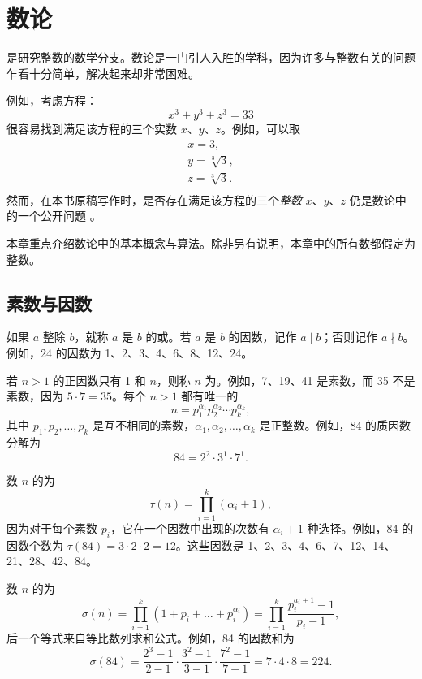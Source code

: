 \chapter{数论}


是研究整数的数学分支。数论是一门引人入胜的学科，因为许多与整数有关的问题乍看十分简单，解决起来却非常困难。

例如，考虑方程：
\[x^3 + y^3 + z^3 = 33\]
很容易找到满足该方程的三个实数 $x$、$y$、$z$。例如，可以取
\[
\begin{array}{lcl}
x = 3, \\
y = \sqrt[3]{3}, \\
z = \sqrt[3]{3}.\\
\end{array}
\]
然而，在本书原稿写作时，是否存在满足该方程的三个\emph{整数} $x$、$y$、$z$ 仍是数论中的一个公开问题 \cite{bec07}。

本章重点介绍数论中的基本概念与算法。除非另有说明，本章中的所有数都假定为整数。

\section{素数与因数}


如果 $a$ 整除 $b$，就称 $a$ 是 $b$ 的或。若 $a$ 是 $b$ 的因数，记作 $a \mid b$；否则记作 $a \nmid b$。例如，24 的因数为 1、2、3、4、6、8、12、24。


若 $n>1$ 的正因数只有 1 和 $n$，则称 $n$ 为。例如，7、19、41 是素数，而 35 不是素数，因为 $5 \cdot 7 = 35$。每个 $n>1$ 都有唯一的
\[ n = p_1^{\alpha_1} p_2^{\alpha_2} \cdots p_k^{\alpha_k},\]
其中 $p_1,p_2,\ldots,p_k$ 是互不相同的素数，$\alpha_1,\alpha_2,\ldots,\alpha_k$ 是正整数。例如，84 的质因数分解为
\[84 = 2^2 \cdot 3^1 \cdot 7^1.\]

数 $n$ 的为
\[\tau(n)=\prod_{i=1}^k (\alpha_i+1),\]
因为对于每个素数 $p_i$，它在一个因数中出现的次数有 $\alpha_i+1$ 种选择。例如，84 的因数个数为 $\tau(84)=3 \cdot 2 \cdot 2 = 12$。这些因数是 1、2、3、4、6、7、12、14、21、28、42、84。

数 $n$ 的为
\[\sigma(n)=\prod_{i=1}^k (1+p_i+\ldots+p_i^{\alpha_i}) = \prod_{i=1}^k \frac{p_i^{a_i+1}-1}{p_i-1},\]
后一个等式来自等比数列求和公式。例如，84 的因数和为
\[\sigma(84)=\frac{2^3-1}{2-1} \cdot \frac{3^2-1}{3-1} \cdot \frac{7^2-1}{7-1} = 7 \cdot 4 \cdot 8 = 224.\]

